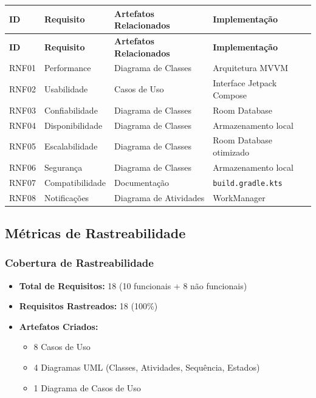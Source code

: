 \documentclass[12pt]{article}
\begin{document}
\begin{longtable}{|p{2cm}|p{4cm}|p{4cm}|p{4cm}|}
\hline
\textbf{ID} & \textbf{Requisito} & \textbf{Artefatos Relacionados} & \textbf{Implementação} \\
\hline
\endfirsthead
\hline
\textbf{ID} & \textbf{Requisito} & \textbf{Artefatos Relacionados} & \textbf{Implementação} \\
\hline
\endhead
RNF01 & Performance & Diagrama de Classes & Arquitetura MVVM \\
\hline
RNF02 & Usabilidade & Casos de Uso & Interface Jetpack Compose \\
\hline
RNF03 & Confiabilidade & Diagrama de Classes & Room Database \\
\hline
RNF04 & Disponibilidade & Diagrama de Classes & Armazenamento local \\
\hline
RNF05 & Escalabilidade & Diagrama de Classes & Room Database otimizado \\
\hline
RNF06 & Segurança & Diagrama de Classes & Armazenamento local \\
\hline
RNF07 & Compatibilidade & Documentação & \texttt{build.gradle.kts} \\
\hline
RNF08 & Notificações & Diagrama de Atividades & WorkManager \\
\hline
\end{longtable}

\subsection{Métricas de Rastreabilidade}

\subsubsection{Cobertura de Rastreabilidade}

\begin{itemize}
    \item \textbf{Total de Requisitos:} 18 (10 funcionais + 8 não funcionais)
    \item \textbf{Requisitos Rastreados:} 18 (100\%)
    \item \textbf{Artefatos Criados:}
    \begin{itemize}
        \item 8 Casos de Uso
        \item 4 Diagramas UML (Classes, Atividades, Sequência, Estados)
        \item 1 Diagrama de Casos de Uso
    \end{itemize}
\end{itemize}
\end{document}
